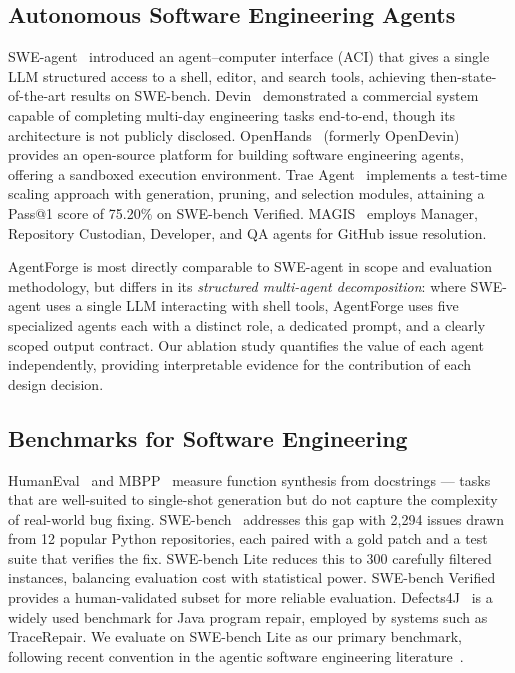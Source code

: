 \subsection{Autonomous Software Engineering Agents}

SWE-agent~\cite{yang2024sweagent} introduced an
agent--computer interface (ACI) that gives a
single LLM structured access to a shell, editor,
and search tools, achieving then-state-of-the-art
results on SWE-bench. Devin~\cite{cognition2024devin}
demonstrated a commercial system capable of
completing multi-day engineering tasks end-to-end,
though its architecture is not publicly disclosed.
OpenHands~\cite{wang2024openhands} (formerly
OpenDevin) provides an open-source platform
for building software engineering agents,
offering a sandboxed execution environment.
Trae Agent~\cite{trae2025} implements a test-time
scaling approach with generation, pruning, and
selection modules, attaining a Pass@1 score of
75.20\% on SWE-bench Verified. MAGIS~\cite{magis2024}
employs Manager, Repository Custodian, Developer,
and QA agents for GitHub issue resolution.

AgentForge is most directly comparable to
SWE-agent in scope and evaluation methodology,
but differs in its \textit{structured multi-agent
decomposition}: where SWE-agent uses a single
LLM interacting with shell tools, AgentForge
uses five specialized agents each with a
distinct role, a dedicated prompt, and a
clearly scoped output contract. Our ablation
study quantifies the value of each agent
independently, providing interpretable evidence
for the contribution of each design decision.

\subsection{Benchmarks for Software Engineering}

HumanEval~\cite{chen2021codex} and
MBPP~\cite{austin2021program} measure function
synthesis from docstrings — tasks that are well-suited
to single-shot generation but do not capture the
complexity of real-world bug fixing.
SWE-bench~\cite{jimenez2024swebench} addresses
this gap with 2,294 issues drawn from 12 popular
Python repositories, each paired with a gold
patch and a test suite that verifies the fix.
SWE-bench Lite reduces this to 300 carefully
filtered instances, balancing evaluation cost
with statistical power. SWE-bench Verified
provides a human-validated subset for more
reliable evaluation. Defects4J~\cite{defects4j}
is a widely used benchmark for Java program
repair, employed by systems such as TraceRepair.
We evaluate on SWE-bench Lite as our primary
benchmark, following recent convention in the
agentic software engineering literature~\cite{yang2024sweagent,
wang2024openhands,zhang2024autocoderover}.

